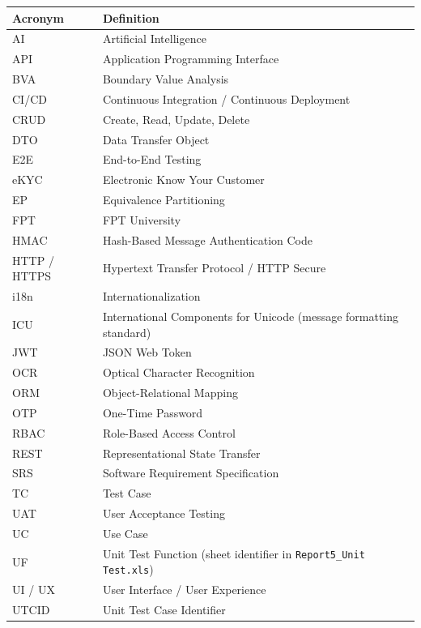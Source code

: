 \documentclass[12pt,a4paper]{article}
\renewcommand{\arraystretch}{1.35}
\begin{document}
\begin{center}
\begingroup\small
\renewcommand{\arraystretch}{1.08}
\setlength{\tabcolsep}{4pt}
\begin{tabularx}{\textwidth}{|L{3.4cm}|Y|}
\hline
{}\textbf{Acronym} & \textbf{Definition} \\ \hline
AI & Artificial Intelligence \\ \hline
API & Application Programming Interface \\ \hline
BVA & Boundary Value Analysis \\ \hline
CI/CD & Continuous Integration / Continuous Deployment \\ \hline
CRUD & Create, Read, Update, Delete \\ \hline
DTO & Data Transfer Object \\ \hline
E2E & End-to-End Testing \\ \hline
eKYC & Electronic Know Your Customer \\ \hline
EP & Equivalence Partitioning \\ \hline
FPT & FPT University \\ \hline
HMAC & Hash-Based Message Authentication Code \\ \hline
HTTP / HTTPS & Hypertext Transfer Protocol / HTTP Secure \\ \hline
i18n & Internationalization \\ \hline
ICU & International Components for Unicode (message formatting standard) \\ \hline
JWT & JSON Web Token \\ \hline
OCR & Optical Character Recognition \\ \hline
ORM & Object-Relational Mapping \\ \hline
OTP & One-Time Password \\ \hline
RBAC & Role-Based Access Control \\ \hline
REST & Representational State Transfer \\ \hline
SRS & Software Requirement Specification \\ \hline
TC & Test Case \\ \hline
UAT & User Acceptance Testing \\ \hline
UC & Use Case \\ \hline
UF & Unit Test Function (sheet identifier in \texttt{Report5\_Unit Test.xls}) \\ \hline
UI / UX & User Interface / User Experience \\ \hline
UTCID & Unit Test Case Identifier \\ \hline
\end{tabularx}
\endgroup
\end{center}
\setcounter{table}{0}
\end{document}
